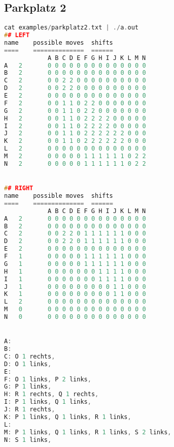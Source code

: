 \documentclass[a4paper,10pt,ngerman]{scrartcl}
\begin{document}
\subsection*{Parkplatz 2}
\begin{lstlisting}[language=C++]
cat examples/parkplatz2.txt | ./a.out
## LEFT
name	possible moves	shifts
====	==============	======
			A B C D E F G H I J K L M N
A	2		0 0 0 0 0 0 0 0 0 0 0 0 0 0
B	2		0 0 0 0 0 0 0 0 0 0 0 0 0 0
C	2		0 0 2 2 0 0 0 0 0 0 0 0 0 0
D	2		0 0 2 2 0 0 0 0 0 0 0 0 0 0
E	2		0 0 0 0 0 0 0 0 0 0 0 0 0 0
F	2		0 0 1 1 0 2 2 0 0 0 0 0 0 0
G	2		0 0 1 1 0 2 2 0 0 0 0 0 0 0
H	2		0 0 1 1 0 2 2 2 2 0 0 0 0 0
I	2		0 0 1 1 0 2 2 2 2 0 0 0 0 0
J	2		0 0 1 1 0 2 2 2 2 2 2 0 0 0
K	2		0 0 1 1 0 2 2 2 2 2 2 0 0 0
L	2		0 0 0 0 0 0 0 0 0 0 0 0 0 0
M	2		0 0 0 0 0 1 1 1 1 1 1 0 2 2
N	2		0 0 0 0 0 1 1 1 1 1 1 0 2 2


## RIGHT
name	possible moves	shifts
====	==============	======
			A B C D E F G H I J K L M N
A	2		0 0 0 0 0 0 0 0 0 0 0 0 0 0
B	2		0 0 0 0 0 0 0 0 0 0 0 0 0 0
C	2		0 0 2 2 0 1 1 1 1 1 1 0 0 0
D	2		0 0 2 2 0 1 1 1 1 1 1 0 0 0
E	2		0 0 0 0 0 0 0 0 0 0 0 0 0 0
F	1		0 0 0 0 0 1 1 1 1 1 1 0 0 0
G	1		0 0 0 0 0 1 1 1 1 1 1 0 0 0
H	1		0 0 0 0 0 0 0 1 1 1 1 0 0 0
I	1		0 0 0 0 0 0 0 1 1 1 1 0 0 0
J	1		0 0 0 0 0 0 0 0 0 1 1 0 0 0
K	1		0 0 0 0 0 0 0 0 0 1 1 0 0 0
L	2		0 0 0 0 0 0 0 0 0 0 0 0 0 0
M	0		0 0 0 0 0 0 0 0 0 0 0 0 0 0
N	0		0 0 0 0 0 0 0 0 0 0 0 0 0 0


A:
B:
C: O 1 rechts,
D: O 1 links,
E:
F: O 1 links, P 2 links,
G: P 1 links,
H: R 1 rechts, Q 1 rechts,
I: P 1 links, Q 1 links,
J: R 1 rechts,
K: P 1 links, Q 1 links, R 1 links,
L:
M: P 1 links, Q 1 links, R 1 links, S 2 links,
N: S 1 links,
\end{lstlisting}
\end{document}
